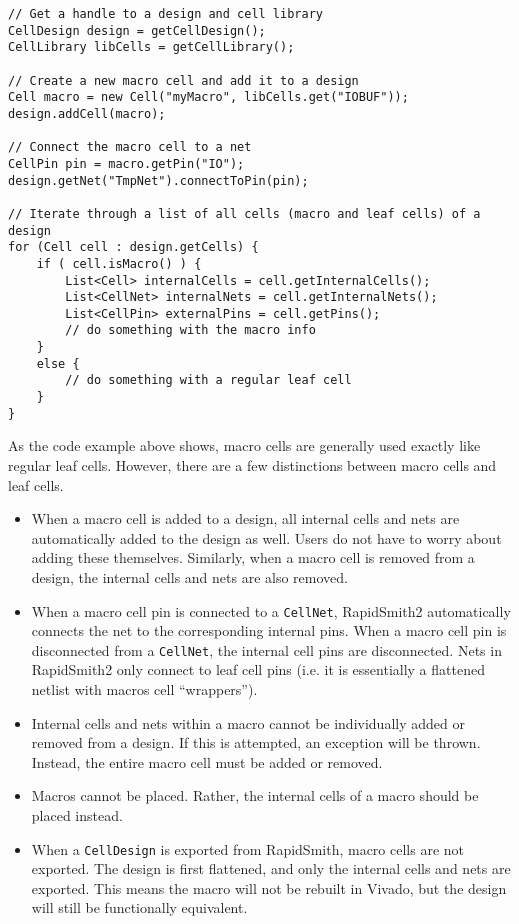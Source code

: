 \begin{lstlisting}[xleftmargin=1.5em, framexleftmargin=1.5em, caption=How to use
macros in RapidSmith, label=code:macros] 
// Get a handle to a design and cell library
CellDesign design = getCellDesign();
CellLibrary libCells = getCellLibrary();

// Create a new macro cell and add it to a design
Cell macro = new Cell("myMacro", libCells.get("IOBUF"));
design.addCell(macro);

// Connect the macro cell to a net 
CellPin pin = macro.getPin("IO");
design.getNet("TmpNet").connectToPin(pin);

// Iterate through a list of all cells (macro and leaf cells) of a design
for (Cell cell : design.getCells) {
	if ( cell.isMacro() ) {
		List<Cell> internalCells = cell.getInternalCells();
		List<CellNet> internalNets = cell.getInternalNets();
		List<CellPin> externalPins = cell.getPins();
		// do something with the macro info
	}
	else {
		// do something with a regular leaf cell 
	}
}

\end{lstlisting}

\noindent
As the code example above shows, macro cells are generally used
exactly like regular leaf cells. However, there are a few distinctions
between macro cells and leaf cells.

\begin{itemize}
  \item When a macro cell is added to a design, all internal
  cells and nets are automatically added to the design as well. Users do
  not have to worry about adding these themselves. Similarly, when a macro cell
  is removed from a design, the internal cells and nets are also removed.
  
  \item When a macro cell pin is connected to a \texttt{CellNet}, RapidSmith2
  automatically connects the net to the corresponding internal pins. When a
  macro cell pin is disconnected from a \texttt{CellNet}, the internal cell pins are
  disconnected. Nets in RapidSmith2 only connect to leaf cell pins (i.e. it is
  essentially a flattened netlist with macros cell ``wrappers'').
  
  \item Internal cells and nets within a macro cannot be individually added or
  removed from a design. If this is attempted, an exception will be
  thrown. Instead, the entire macro cell must be added or removed.
  
  \item Macros cannot be placed. Rather, the internal cells of a macro should be
  placed instead.
  
  \item When a \texttt{CellDesign} is exported from RapidSmith, macro cells are not
  exported. The design is first flattened, and only the internal cells and nets
  are exported. This means the macro will not be rebuilt in Vivado, but the
  design will still be functionally equivalent.
\end{itemize}

